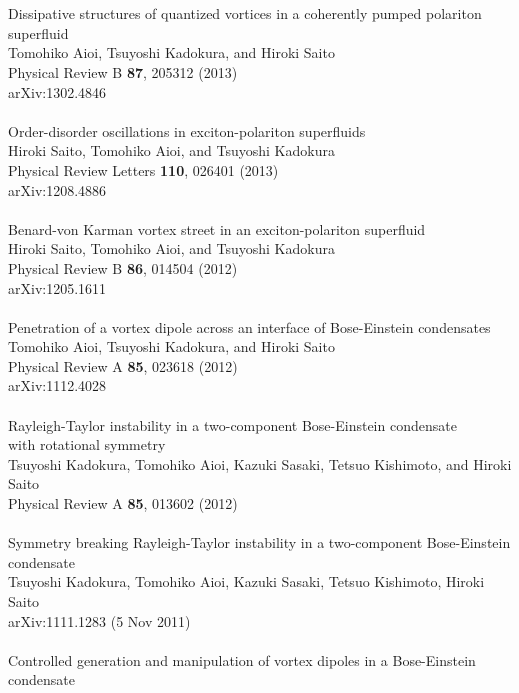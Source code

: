 \documentclass[12pt,a4paper]{report}
\begin{document}
\\
\\
Dissipative structures of quantized vortices in a coherently pumped polariton superfluid 
\\
Tomohiko Aioi, Tsuyoshi Kadokura, and Hiroki Saito
\\
Physical Review B {\bf 87}, 205312 (2013)
\\
arXiv:1302.4846
\\
\\
Order-disorder oscillations in exciton-polariton superfluids 
\\
Hiroki Saito, Tomohiko Aioi, and Tsuyoshi Kadokura 
\\
Physical Review Letters {\bf 110}, 026401 (2013)
\\
arXiv:1208.4886
\\
\\
Benard-von Karman vortex street in an exciton-polariton superfluid 
\\
Hiroki Saito, Tomohiko Aioi, and Tsuyoshi Kadokura 
\\
Physical Review B {\bf 86}, 014504 (2012)
\\
arXiv:1205.1611
\\
\\
Penetration of a vortex dipole across an interface of Bose-Einstein condensates 
\\
Tomohiko Aioi, Tsuyoshi Kadokura, and Hiroki Saito 
\\
Physical Review A {\bf 85}, 023618 (2012)
\\
arXiv:1112.4028
\\
\\
Rayleigh-Taylor instability in a two-component Bose-Einstein condensate
\\
with rotational symmetry 
\\
Tsuyoshi Kadokura, Tomohiko Aioi, Kazuki Sasaki, Tetsuo Kishimoto, and Hiroki Saito 
\\
Physical Review A {\bf 85}, 013602 (2012) 
\\
\\
Symmetry breaking Rayleigh-Taylor instability in a two-component Bose-Einstein condensate
\\
Tsuyoshi Kadokura, Tomohiko Aioi, Kazuki Sasaki, Tetsuo Kishimoto, Hiroki Saito 
\\
arXiv:1111.1283 (5 Nov 2011)
\\
\\
Controlled generation and manipulation of vortex dipoles in a Bose-Einstein condensate 
\\
\end{document}
